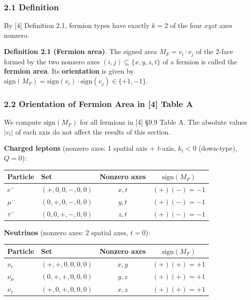 \documentclass[
  a4paper,11pt]{article}
\newcounter{none} %
\begin{document}
\subsubsection{2.1 Definition}\label{definition}

By {[}4{]} Definition 2.1, fermion types have exactly \(k = 2\) of the
four \(xyzt\) axes nonzero.

\textbf{Definition 2.1 (Fermion area)}. The signed area
\(M_F = v_i \cdot v_j\) of the 2-face formed by the two nonzero axes
\((i, j) \subseteq \{x, y, z, t\}\) of a fermion is called the
\textbf{fermion area}. Its \textbf{orientation} is given by
\(\text{sign}(M_F) = \text{sign}(v_i) \cdot \text{sign}(v_j) \in \{+1, -1\}\).

\subsubsection{2.2 Orientation of Fermion Area in {[}4{]} Table
A}\label{orientation-of-fermion-area-in-4-table-a}

We compute \(\text{sign}(M_F)\) for all fermions in {[}4{]} §9.9 Table
A. The absolute values \(|v_i|\) of each axis do not affect the results
of this section.

\textbf{Charged leptons} (nonzero axes: 1 spatial axis + \(t\)-axis,
\(k_t < 0\) (down-type), \(Q = 0\)):

{\def\LTcaptype{none} %
\begin{longtable}[]{@{}llcc@{}}
\toprule\noalign{}
Particle & Set & Nonzero axes & \(\text{sign}(M_F)\) \\
\midrule\noalign{}
\endhead
\bottomrule\noalign{}
\endlastfoot
\(e^-\) & \((+, 0, 0, -, 0, 0)\) & \(x, t\) & \((+)(-)= -1\) \\
\(\mu^-\) & \((0, +, 0, -, 0, 0)\) & \(y, t\) & \((+)(-)= -1\) \\
\(\tau^-\) & \((0, 0, +, -, 0, 0)\) & \(z, t\) & \((+)(-)= -1\) \\
\end{longtable}
}

\textbf{Neutrinos} (nonzero axes: 2 spatial axes, \(t = 0\)):

{\def\LTcaptype{none} %
\begin{longtable}[]{@{}llcc@{}}
\toprule\noalign{}
Particle & Set & Nonzero axes & \(\text{sign}(M_F)\) \\
\midrule\noalign{}
\endhead
\bottomrule\noalign{}
\endlastfoot
\(\nu_e\) & \((+, +, 0, 0, 0, 0)\) & \(x, y\) & \((+)(+)= +1\) \\
\(\nu_\mu\) & \((0, +, +, 0, 0, 0)\) & \(y, z\) & \((+)(+)= +1\) \\
\(\nu_\tau\) & \((+, 0, +, 0, 0, 0)\) & \(x, z\) & \((+)(+)= +1\) \\
\end{longtable}
}
\end{document}

